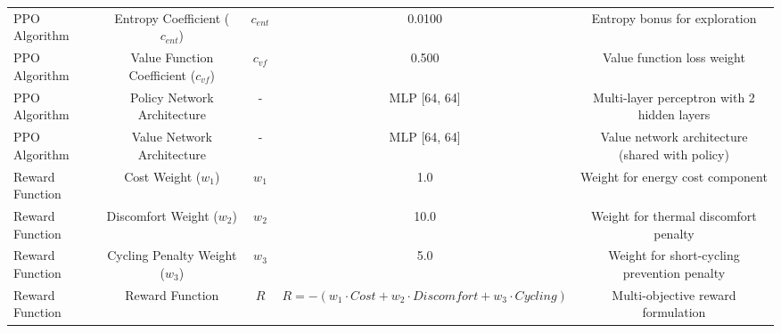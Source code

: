 \begin{table}[h]
\begin{tabular}{lcccc}
PPO Algorithm & Entropy Coefficient ($c_{ent}$) & $c_{ent}$ & 0.0100 & Entropy bonus for exploration \\
PPO Algorithm & Value Function Coefficient ($c_{vf}$) & $c_{vf}$ & 0.500 & Value function loss weight \\
PPO Algorithm & Policy Network Architecture & - & MLP [64, 64] & Multi-layer perceptron with 2 hidden layers \\
PPO Algorithm & Value Network Architecture & - & MLP [64, 64] & Value network architecture (shared with policy) \\
Reward Function & Cost Weight ($w_1$) & $w_1$ & 1.0 & Weight for energy cost component \\
Reward Function & Discomfort Weight ($w_2$) & $w_2$ & 10.0 & Weight for thermal discomfort penalty \\
Reward Function & Cycling Penalty Weight ($w_3$) & $w_3$ & 5.0 & Weight for short-cycling prevention penalty \\
Reward Function & Reward Function & $R$ & $R = -(w_1 \cdot Cost + w_2 \cdot Discomfort + w_3 \cdot Cycling)$ & Multi-objective reward formulation \\
\bottomrule
\end{tabular}
\end{table}
